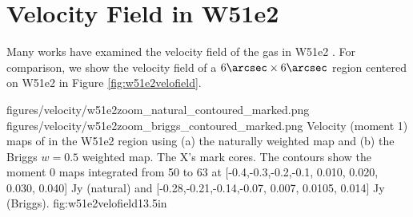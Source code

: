 \section{Velocity Field in W51e2}
\label{sec:vfield}
Many works have examined the velocity field of the gas in W51e2
\citep{Zhang1997a,Keto2008b,Shi2010b,Shi2010a,Goddi2016a}.  For comparison, we
show the velocity field of a $6\arcsec\times6\arcsec$ region centered on W51e2
in Figure
\ref{fig:w51e2velofield}.

\FigureTwo
{figures/velocity/w51e2zoom_natural_contoured_marked.png}
{figures/velocity/w51e2zoom_briggs_contoured_marked.png}
{Velocity (moment 1) maps of \ortho \twotwo in the W51e2 region using (a) the
naturally weighted map and (b) the Briggs $w=0.5$ weighted map.  The X's mark
\citet{Shi2010a} cores.   
The contours show the moment 0 maps integrated from 50 to 63 \kms at
[-0.4,-0.3,-0.2,-0.1, 0.010, 0.020, 0.030, 0.040] Jy \kms (natural) and
[-0.28,-0.21,-0.14,-0.07, 0.007, 0.0105, 0.014] Jy \kms (Briggs).
}
{fig:w51e2velofield}{1}{3.5in}


